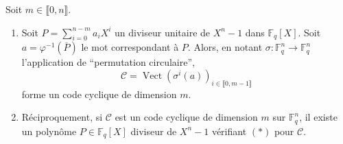   \begin{theorem}
    Soit $m \in \llbracket 0, n \rrbracket$.
    \begin{enumerate}[label=(\roman*)]
      \item Soit $P = \sum_{i=0}^{n-m} a_i X^i$ un diviseur unitaire de $X^n - 1$ dans $\mathbb{F}_q[X]$. Soit $a = \varphi^{-1}(\overline{P})$ le mot correspondant à $P$. Alors, en notant $\sigma : \mathbb{F}_q^n \rightarrow \mathbb{F}_q^n$ l'application de ``permutation circulaire'',
      \[ \mathcal{C} = \operatorname{Vect}(\sigma^{i}(a))_{i \in \llbracket 0, m-1 \rrbracket} \tag{$*$} \]
      forme un code cyclique de dimension $m$.
      \item Réciproquement, si $\mathcal{C}$ est un code cyclique de dimension $m$ sur $\mathbb{F}_q^n$, il existe un polynôme $P \in \mathbb{F}_q[X]$ diviseur de $X^n - 1$ vérifiant $(*)$ pour $\mathcal{C}$.
    \end{enumerate}
  \end{theorem}

